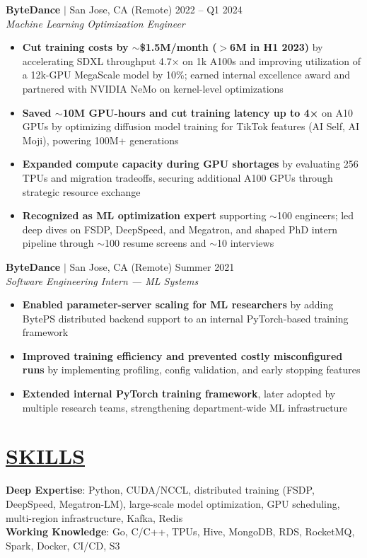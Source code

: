 \documentclass[overlapped,line,11pt]{res}
\begin{document}
\begin{resume}
\textbf{ByteDance} $|$ San Jose, CA (Remote) \hfill 2022 -- Q1 2024\\
{\sl Machine Learning Optimization Engineer}
\vspace{4pt}
\begin{itemize} \itemsep 2pt
  \item \textbf{Cut training costs by $\sim$\$1.5M/month ($>$6M in H1 2023)} by accelerating SDXL throughput 4.7× on 1k A100s and improving utilization of a 12k-GPU MegaScale model by 10\%; earned internal excellence award and partnered with NVIDIA NeMo on kernel-level optimizations
  \item \textbf{Saved $\sim$10M GPU-hours and cut training latency up to 4×} on A10 GPUs by optimizing diffusion model training for TikTok features (AI Self, AI Moji), powering 100M+ generations
  \item \textbf{Expanded compute capacity during GPU shortages} by evaluating 256 TPUs and migration tradeoffs, securing additional A100 GPUs through strategic resource exchange
  \item \textbf{Recognized as ML optimization expert} supporting $\sim$100 engineers; led deep dives on FSDP, DeepSpeed, and Megatron, and shaped PhD intern pipeline through $\sim$100 resume screens and $\sim$10 interviews
\end{itemize}




\textbf{ByteDance} $|$ San Jose, CA (Remote) \hfill Summer 2021\\
{\sl Software Engineering Intern — ML Systems}
\vspace{4pt}
\begin{itemize} \itemsep 2pt
  \item \textbf{Enabled parameter-server scaling for ML researchers} by adding BytePS distributed backend support to an internal PyTorch-based training framework
  \item \textbf{Improved training efficiency and prevented costly misconfigured runs} by implementing profiling, config validation, and early stopping features
  \item \textbf{Extended internal PyTorch training framework}, later adopted by multiple research teams, strengthening department-wide ML infrastructure

\end{itemize}

\section{\underline{SKILLS}}
\vspace{4pt}
\textbf{Deep Expertise}: Python, CUDA/NCCL, distributed training (FSDP, DeepSpeed, Megatron-LM), large-scale model optimization, GPU scheduling, multi-region infrastructure, Kafka, Redis \\
\textbf{Working Knowledge}: Go, C/C++, TPUs, Hive, MongoDB, RDS, RocketMQ, Spark, Docker, CI/CD, S3


\end{resume}
\end{document}
